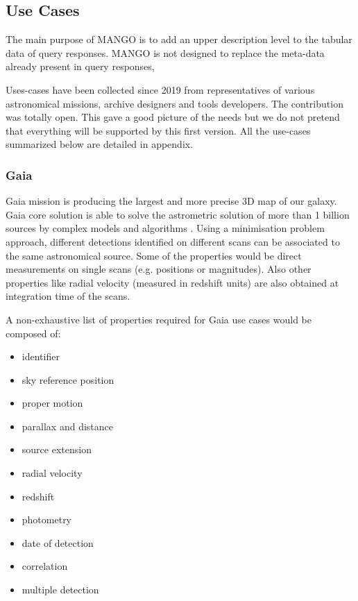 \documentclass[11pt,a4paper]{ivoa}
\begin{document}
\subsection{Use Cases}

The main purpose of MANGO is to add an upper description level to the tabular data of query responses.
MANGO is not designed to replace the meta-data already present in query responses, 

Uses-cases have been collected since 2019 from representatives of various astronomical 
missions, archive designers and tools developers.
The contribution was totally open. This gave a good picture of the needs but we do not pretend 
that everything will be supported by this first version.
All the use-cases summarized below are detailed in appendix.

\subsubsection{Gaia}
Gaia mission is producing the largest and more precise 3D map of our galaxy.
Gaia core solution is able to solve the astrometric solution of more than 1
billion sources by complex models and algorithms \citep{2012A&A...538A..78L}.
Using a minimisation problem approach, different detections identified on
different scans can be associated to the same astronomical source. Some of the
properties would be direct measurements on single scans (e.g. positions or
magnitudes). Also other properties like radial velocity (measured in redshift
units) are also obtained at integration time of the scans.

A non-exhaustive list of properties required for Gaia use cases would be composed
of:

\begin{itemize}[noitemsep,topsep=0pt,parsep=0pt,partopsep=0pt]
    \item identifier
    \item sky reference position
    \item proper motion
    \item parallax and distance

    \item source extension
    \item radial velocity
    \item redshift
    \item photometry
    \item date of detection
    \item correlation
    \item multiple detection
\end{itemize}
\end{document}
